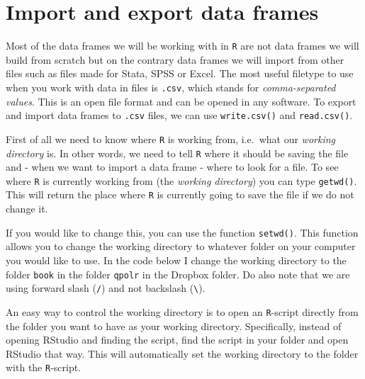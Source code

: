 \documentclass[12pt,oneside]{reedthesis}
\theoremstyle{definition}
\theoremstyle{definition}
\theoremstyle{definition}
\theoremstyle{remark}
\begin{document}
  \section{Import and export data
  frames}\label{import-and-export-data-frames}
  
  Most of the data frames we will be working with in \texttt{R} are not
  data frames we will build from scratch but on the contrary data frames
  we will import from other files such as files made for Stata, SPSS or
  Excel. The most useful filetype to use when you work with data in files
  is \texttt{.csv}, which stands for \emph{comma-separated values}. This
  is an open file format and can be opened in any software. To export and
  import data frames to \texttt{.csv} files, we can use
  \texttt{write.csv()} and \texttt{read.csv()}.
  
  First of all we need to know where \texttt{R} is working from, i.e.~what
  our \emph{working directory} is. In other words, we need to tell
  \texttt{R} where it should be saving the file and - when we want to
  import a data frame - where to look for a file. To see where \texttt{R}
  is currently working from (the \emph{working directory}) you can type
  \texttt{getwd()}. This will return the place where \texttt{R} is
  currently going to save the file if we do not change it.
  \begin{Shaded}
  \begin{Highlighting}[]
  \NormalTok{()}
  \end{Highlighting}
  \end{Shaded}
  If you would like to change this, you can use the function
  \texttt{setwd()}. This function allows you to change the working
  directory to whatever folder on your computer you would like to use. In
  the code below I change the working directory to the folder
  \texttt{book} in the folder \texttt{qpolr} in the Dropbox folder. Do
  also note that we are using forward slash (\texttt{/}) and not backslash
  (\texttt{\textbackslash{}}).
  \begin{Shaded}
  \begin{Highlighting}[]
  \NormalTok{(}\NormalTok{)}
  \end{Highlighting}
  \end{Shaded}
  An easy way to control the working directory is to open an
  \texttt{R}-script directly from the folder you want to have as your
  working directory. Specifically, instead of opening RStudio and finding
  the script, find the script in your folder and open RStudio that way.
  This will automatically set the working directory to the folder with the
  \texttt{R}-script.
  
\end{document}
